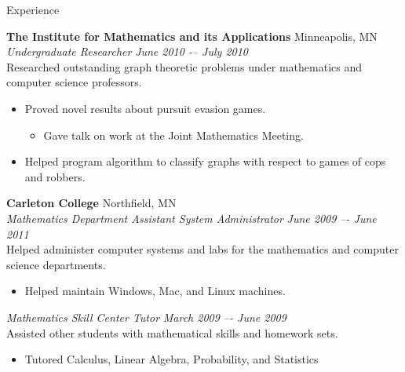 \documentclass{resume} %
\begin{document}
\begin{rSection}{Experience}

\vspace{0.4em}
\newpage


{\bf The Institute for Mathematics and its Applications} \hfill Minneapolis, MN \\
{\em Undergraduate Researcher} \hfill {\em June 2010 -– July 2010} \vspace{0.3em} \\
Researched outstanding graph theoretic problems under mathematics and computer science professors. 
\begin{itemize} \itemsep -0.2em
	\item Proved novel results about pursuit evasion games.
	\begin{itemize} \itemsep -0.2em
		\item Gave talk on work at the Joint Mathematics Meeting.
	\end{itemize}
	\item Helped program algorithm to classify graphs with respect to games of cops and robbers.
\end{itemize}

\vspace{0.4em}



{\bf Carleton College} \hfill Northfield, MN \\
{\em Mathematics Department Assistant System Administrator} \hfill {\em June 2009 –- June 2011} \vspace{0.3em} \\
Helped administer computer systems and labs for the mathematics and computer science departments. 
\begin{itemize} \itemsep -0.2em
	\item Helped maintain Windows, Mac, and Linux machines.
\end{itemize}

\vspace{0.4em}

{\em Mathematics Skill Center Tutor} \hfill {\em March 2009 –- June 2009} \vspace{0.3em} \\
Assisted other students with mathematical skills and homework sets.
\begin{itemize} \itemsep -0.2em
	\item Tutored Calculus, Linear Algebra, Probability, and Statistics
\end{itemize}

\end{rSection}
\end{document}
